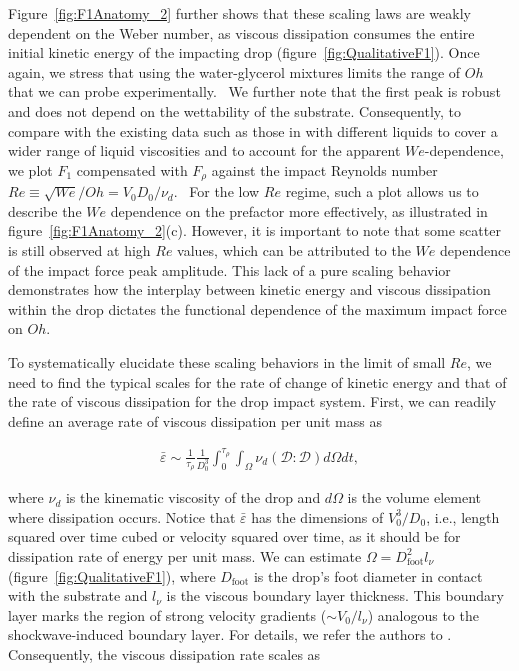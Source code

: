 \documentclass{jfm}
\begin{document}
Figure~\ref{fig:F1Anatomy_2} further shows that these scaling laws are weakly dependent on the Weber number, as viscous dissipation consumes the entire initial kinetic energy of the impacting drop (figure~\ref{fig:QualitativeF1}). Once again, we stress that using the water-glycerol mixtures limits the range of $Oh$ that we can probe experimentally. 
We further note that the first peak is robust and does not depend on the wettability of the substrate. Consequently, to compare with the existing data such as those in \citet{cheng2021drop} with different liquids to cover a wider range of liquid viscosities and to account for the apparent $We$-dependence, we plot $F_1$ compensated with $F_\rho$ against the impact Reynolds number $Re \equiv \sqrt{We}/Oh = V_0D_0/\nu_d$. 
For the low $Re$ regime, such a plot allows us to describe the $We$ dependence on the prefactor more effectively, as illustrated in figure~\ref{fig:F1Anatomy_2}(c). However, it is important to note that some scatter is still observed at high $Re$ values, which can be attributed to the $We$ dependence of the impact force peak amplitude. This lack of a pure scaling behavior demonstrates how the interplay between kinetic energy and viscous dissipation within the drop dictates the functional dependence of the maximum impact force on $Oh$.

To systematically elucidate these scaling behaviors in the limit of small $Re$, we need to find the typical scales for the rate of change of kinetic energy and that of the rate of viscous dissipation for the drop impact system. First, we can readily define an average rate of viscous dissipation per unit mass as

\begin{align}
	\bar{\varepsilon} \sim \frac{1}{\tau_\rho}\frac{1}{D_0^3}\int_0^{\tau_\rho}\int_\Omega\nu_d\left(\boldsymbol{\mathcal{D}:\mathcal{D}}\right)d\Omega dt,
\end{align}

\noindent where $\nu_d$ is the kinematic viscosity of the drop and $d\Omega$ is the volume element where dissipation occurs. Notice that $\bar{\varepsilon}$ has the dimensions of $V_0^3/D_0$, i.e., length squared over time cubed or velocity squared over time, as it should be for dissipation rate of energy per unit mass. We can estimate $\Omega = D_{\text{foot}}^2l_\nu$ (figure~\ref{fig:QualitativeF1}), where $D_{\text{foot}}$ is the drop's foot diameter in contact with the substrate and $l_\nu$ is the viscous boundary layer thickness. This boundary layer marks the region of strong velocity gradients ($\sim V_0/l_\nu$) analogous to the \citet{mirels1955laminar} shockwave-induced boundary layer. For details, we refer the authors to \citet{schlichting2016boundary, Schroll2010, Philippi2016}. Consequently, the viscous dissipation rate scales as
\end{document}
